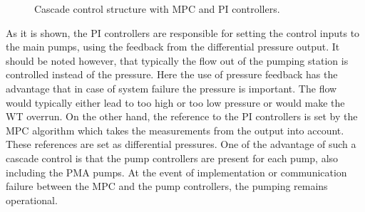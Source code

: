 
\begin{figure}[H]
\centering
 
\caption{Cascade control structure with MPC and PI controllers.}
\label{fig:control_structure}
\end{figure}

As it is shown, the PI controllers are responsible for setting the control inputs to the main pumps, using the feedback from the differential pressure output. It should be noted however, that typically the flow out of the pumping station is controlled instead of the pressure. Here the use of pressure feedback has the advantage that in case of system failure the pressure is important. The flow would typically either lead to too high or too low pressure or would make the WT overrun. On the other hand, the reference to the PI controllers is set by the MPC algorithm which takes the measurements from the output into account. These references are set as differential pressures. One of the advantage of such a cascade control is that the pump controllers are present for each pump, also including the PMA pumps. At the event of implementation or communication failure between the MPC and the pump controllers, the pumping remains operational. 
 



